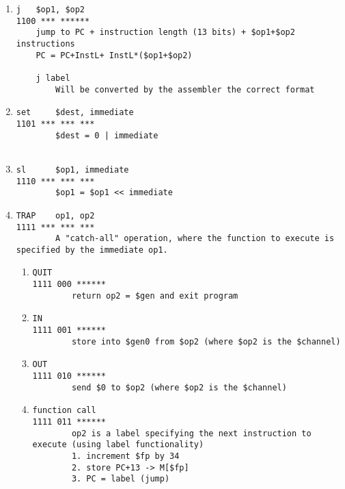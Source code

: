 \documentclass{article}
\begin{document}
\begin{enumerate}[resume]
\item 
\begin{verbatim}
j   $op1, $op2
1100 *** ******
    jump to PC + instruction length (13 bits) + $op1+$op2 instructions
    PC = PC+InstL+ InstL*($op1+$op2)
    
    j label 
        Will be converted by the assembler the correct format

\end{verbatim}
\item 
\begin{verbatim}
set     $dest, immediate
1101 *** *** ***
        $dest = 0 | immediate
       

\end{verbatim}
\item 
\begin{verbatim}
sl      $op1, immediate
1110 *** *** ***
        $op1 = $op1 << immediate

\end{verbatim}
\item 
\begin{verbatim}
TRAP    op1, op2
1111 *** *** ***
        A "catch-all" operation, where the function to execute is specified by the immediate op1.
\end{verbatim}
\begin{enumerate}

\item 
\begin{verbatim}
QUIT 
1111 000 ******
        return op2 = $gen and exit program

\end{verbatim}
\item 
\begin{verbatim}
IN
1111 001 ******
        store into $gen0 from $op2 (where $op2 is the $channel)

\end{verbatim}
\item 
\begin{verbatim}
OUT
1111 010 ******
        send $0 to $op2 (where $op2 is the $channel)

\end{verbatim}
\item 
\begin{verbatim}
function call
1111 011 ******
        op2 is a label specifying the next instruction to execute (using label functionality)
        1. increment $fp by 34
        2. store PC+13 -> M[$fp]
        3. PC = label (jump)


\end{verbatim}
\end{enumerate}
\end{enumerate}
\end{document}
